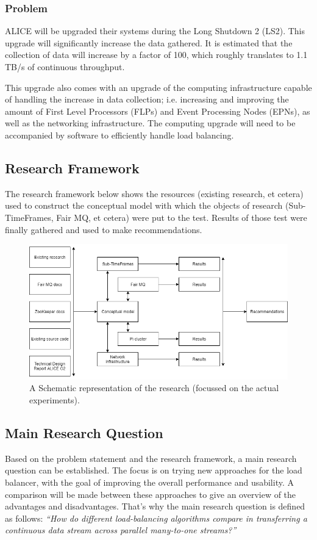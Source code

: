 \documentclass[]{article}
\begin{document}
\subsubsection{Problem}
ALICE will be upgraded their systems during the Long Shutdown 2 (LS2). This upgrade will significantly increase the data gathered. It is estimated that the collection of data will increase by a factor of 100, which roughly translates to 1.1 TB/s of continuous throughput.

This upgrade also comes with an upgrade of the computing infrastructure capable of handling the increase in data collection; i.e. increasing and improving the amount of First Level Processors (FLPs) and Event Processing Nodes (EPNs), as well as the networking infrastructure. The computing upgrade will need to be accompanied by software to efficiently handle load balancing.


\subsection{Research Framework}
The research framework below shows the resources (existing research, et cetera) used to construct the conceptual model with which the objects of research (Sub-TimeFrames, Fair MQ, et cetera) were put to the test. Results of those test were finally gathered and used to make recommendations.

\begin{center}
	\begin{figure}[H]
		\includegraphics[width=\textwidth]{research-model}
		\caption{A Schematic representation of the research (focussed on the actual experiments).}
		\label{fig:ssh}
	\end{figure}
\end{center}


\subsection{Main Research Question}
Based on the problem statement and the research framework, a main research question can be established. The focus is on trying new approaches for the load balancer, with the goal of improving the overall performance and usability. A comparison will be made between these approaches to give an overview of the advantages and disadvantages. That’s why the main research question is defined as follows: \textit{“How do different load-balancing algorithms compare in transferring a continuous data stream across parallel many-to-one streams?”}
\end{document}
